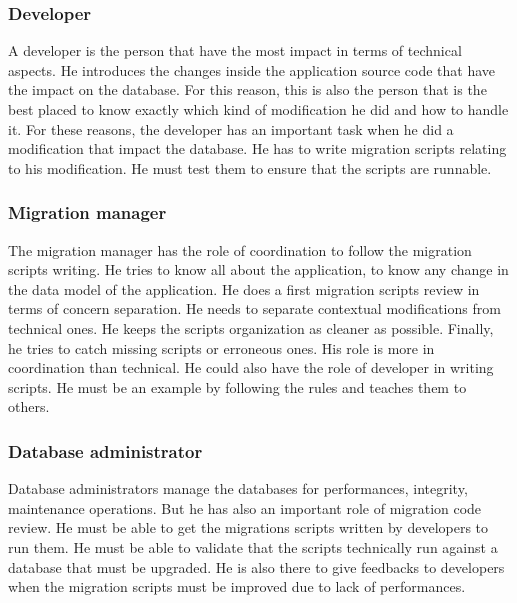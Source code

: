 \subsubsection{Developer\\}
	\label{sec:def:developer}

A developer is the person that have the most impact in terms of technical aspects. He introduces the changes inside the application source code that have the impact on the database. For this reason, this is also the person that is the best placed to know exactly which kind of modification he did and how to handle it. For these reasons, the developer has an important task when he did a modification that impact the database. He has to write migration scripts relating to his modification. He must test them to ensure that the scripts are runnable.

\subsubsection{Migration manager\\}

The migration manager has the role of coordination to follow the migration scripts writing. He tries to know all about the application, to know any change in the data model of the application. He does a first migration scripts review in terms of concern separation. He needs to separate contextual modifications from technical ones. He keeps the scripts organization as cleaner as possible. Finally, he tries to catch missing scripts or erroneous ones. His role is more in coordination than technical. He could also have the role of developer in writing scripts. He must be an example by following the rules and teaches them to others.

\subsubsection{Database administrator\\}

Database administrators manage the databases for performances, integrity, maintenance operations. But he has also an important role of migration code review. He must be able to get the migrations scripts written by developers to run them. He must be able to validate that the scripts technically run against a database that must be upgraded. He is also there to give feedbacks to developers when the migration scripts must be improved due to lack of performances. 


